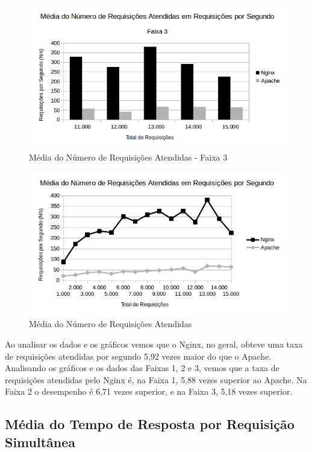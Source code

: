 \begin{figure}[H]
	\centering
	\includegraphics[width=1\linewidth]{graficos/grafico4-f3} 
	\caption{Média do Número de Requisições Atendidas - Faixa 3}
	\label{fig:grafico4-f3}
\end{figure}

\begin{figure}[H]
	\centering
	\includegraphics[width=1\linewidth]{graficos/grafico4} 
	\caption{Média do Número de Requisições Atendidas}
	\label{fig:grafico4}
\end{figure}

Ao analisar os dados e os gráficos vemos que o Nginx, no geral, obteve uma taxa 
de requisições atendidas por segundo 5,92 vezes maior do que o Apache. 
Analisando os gráficos e os dados das Faixas 1, 2 e 3, vemos que a taxa de 
requisições atendidas pelo Nginx é, na Faixa 1, 5,88 vezes superior ao Apache. 
Na Faixa 2 o desempenho é 6,71 vezes superior, e na Faixa 3, 5,18 vezes 
superior. 

\subsection{Média do Tempo de Resposta por Requisição Simultânea}

